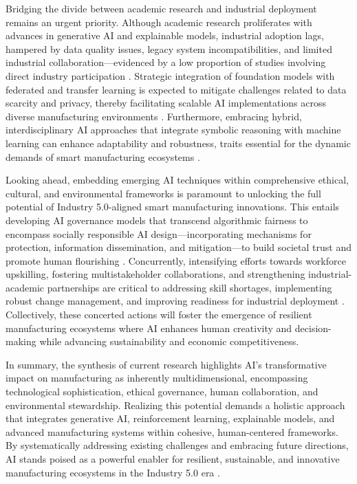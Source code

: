 \documentclass[11pt]{article}
\begin{document}
Bridging the divide between academic research and industrial deployment remains an urgent priority. Although academic research proliferates with advances in generative AI and explainable models, industrial adoption lags, hampered by data quality issues, legacy system incompatibilities, and limited industrial collaboration—evidenced by a low proportion of studies involving direct industry participation \cite{ref3,ref7}. Strategic integration of foundation models with federated and transfer learning is expected to mitigate challenges related to data scarcity and privacy, thereby facilitating scalable AI implementations across diverse manufacturing environments \cite{ref5,ref8}. Furthermore, embracing hybrid, interdisciplinary AI approaches that integrate symbolic reasoning with machine learning can enhance adaptability and robustness, traits essential for the dynamic demands of smart manufacturing ecosystems \cite{ref35,ref37}.

Looking ahead, embedding emerging AI techniques within comprehensive ethical, cultural, and environmental frameworks is paramount to unlocking the full potential of Industry 5.0-aligned smart manufacturing innovations. This entails developing AI governance models that transcend algorithmic fairness to encompass socially responsible AI design—incorporating mechanisms for protection, information dissemination, and mitigation—to build societal trust and promote human flourishing \cite{ref25}. Concurrently, intensifying efforts towards workforce upskilling, fostering multistakeholder collaborations, and strengthening industrial-academic partnerships are critical to addressing skill shortages, implementing robust change management, and improving readiness for industrial deployment \cite{ref2,ref3,ref21}. Collectively, these concerted actions will foster the emergence of resilient manufacturing ecosystems where AI enhances human creativity and decision-making while advancing sustainability and economic competitiveness.

In summary, the synthesis of current research highlights AI’s transformative impact on manufacturing as inherently multidimensional, encompassing technological sophistication, ethical governance, human collaboration, and environmental stewardship. Realizing this potential demands a holistic approach that integrates generative AI, reinforcement learning, explainable models, and advanced manufacturing systems within cohesive, human-centered frameworks. By systematically addressing existing challenges and embracing future directions, AI stands poised as a powerful enabler for resilient, sustainable, and innovative manufacturing ecosystems in the Industry 5.0 era \cite{ref1,ref2,ref3,ref4,ref5}.



\end{document}
